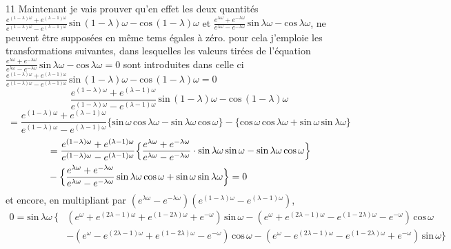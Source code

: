 \documentclass[11pt,a4paper]{article}
\begin{document}
11 Maintenant je vais prouver qu'en effet les deux quantités $\frac{e^{(1-\lambda)\omega} + e^{(\lambda-1)\omega}}{e^{(1-\lambda)\omega} - e^{(\lambda-1)\omega}}\,\text{sin}\,(1-\lambda)\omega - \text{cos}\,(1-\lambda)\omega$
et $\frac{e^{\lambda\omega} + e^{-\lambda\omega}}{e^{\lambda\omega} - e^{-\lambda\omega}}\,\text{sin}\,\lambda\omega - \text{cos}\,\lambda\omega$, ne peuvent être supposées en même tems égales à zéro.
pour cela j'emploie les transformations suivantes, dans lesquelles les valeurs tirées de l'équation
$\frac{e^{\lambda\omega} + e^{-\lambda\omega}}{e^{\lambda\omega} - e^{-\lambda\omega}}\,\text{sin}\,\lambda\omega - \text{cos}\,\lambda\omega = 0$ sont introduites dans celle ci $\frac{e^{(1-\lambda)\omega} + e^{(\lambda-1)\omega}}{e^{(1-\lambda)\omega} - e^{(\lambda-1)\omega}}\,\text{sin}\,(1-\lambda)\omega - \text{cos}\,(1-\lambda)\omega = 0$
\[ \frac{e^{(1-\lambda)\omega} + e^{(\lambda-1)\omega}}{e^{(1-\lambda)\omega} - e^{(\lambda-1)\omega}}\,\text{sin}\,(1-\lambda)\omega - \text{cos}\,(1-\lambda)\omega \]
\[ = \frac{e^{(1-\lambda)\omega} + e^{(\lambda-1)\omega}}{e^{(1-\lambda)\omega} - e^{(\lambda-1)\omega}}\{\text{sin}\,\omega\,\text{cos}\,\lambda\omega - \text{sin}\,\lambda\omega\,\text{cos}\,\omega\} - \{\text{cos}\,\omega\,\text{cos}\,\lambda\omega + \text{sin}\,\omega\,\text{sin}\,\lambda\omega\} \]
\begin{align*}
&= \frac{e^{(1-\lambda)\omega} + e^{(\lambda-1)\omega}}{e^{(1-\lambda)\omega} - e^{(\lambda-1)\omega}}\Bigl\{\frac{e^{\lambda\omega} + e^{-\lambda\omega}}{e^{\lambda\omega} - e^{-\lambda\omega}}\cdot\text{sin}\,\lambda\omega\,\text{sin}\,\omega - \text{sin}\,\lambda\omega\,\text{cos}\,\omega\Bigr\} \\
&- \Bigl\{\frac{e^{\lambda\omega} + e^{-\lambda\omega}}{e^{\lambda\omega} - e^{-\lambda\omega}}\,\text{sin}\,\lambda\omega\,\text{cos}\,\omega + \text{sin}\,\omega\,\text{sin}\,\lambda\omega\Bigr\} = 0
\end{align*}
et encore, en multipliant par $(e^{\lambda\omega} - e^{-\lambda\omega})(e^{(1-\lambda)\omega} - e^{(\lambda-1)\omega})$,
\begin{align*}
0 = \text{sin}\,\lambda\omega\,\bigl\{&(e^{\omega} + e^{(2\lambda-1)\omega} + e^{(1-2\lambda)\omega} + e^{-\omega})\,\text{sin}\,\omega - (e^{\omega} + e^{(2\lambda-1)\omega} - e^{(1-2\lambda)\omega} - e^{-\omega})\,\text{cos}\,\omega \\
&- (e^{\omega} - e^{(2\lambda-1)\omega} + e^{(1-2\lambda)\omega} - e^{-\omega})\,\text{cos}\,\omega - (e^{\omega} - e^{(2\lambda-1)\omega} - e^{(1-2\lambda)\omega} + e^{-\omega})\,\text{sin}\,\omega\bigr\}
\end{align*}
\end{document}
